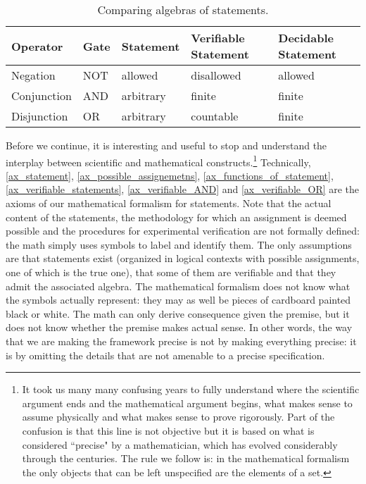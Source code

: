 \documentclass[11pt,letterpaper,fleqn]{memoir} %
\begin{document}
\begin{table}[h]
	\centering
\begin{tabular}{p{} p{} p{} p{} p{}}
	Operator & Gate & Statement & Verifiable Statement & Decidable Statement  \\ 
	\hline 
	Negation & NOT & allowed & disallowed & allowed \\ 
	Conjunction & AND & arbitrary  & finite & finite \\ 
	Disjunction & OR & arbitrary  & countable & finite \\ 
\end{tabular}
	\caption{Comparing algebras of statements.}
\end{table}

Before we continue, it is interesting and useful to stop and understand the interplay between scientific and mathematical constructs.\footnote{It took us many many confusing years to fully understand where the scientific argument ends and the mathematical argument begins, what makes sense to assume physically and what makes sense to prove rigorously. Part of the confusion is that this line is not objective but it is based on what is considered ``precise" by a mathematician, which has evolved considerably through the centuries. The rule we follow is: in the mathematical formalism the only objects that can be left unspecified are the elements of a set.} Technically, \ref{ax_statement}, \ref{ax_possible_assignemetns}, \ref{ax_functions_of_statement}, \ref{ax_verifiable_statements}, \ref{ax_verifiable_AND} and \ref{ax_verifiable_OR} are the axioms of our mathematical formalism for statements. Note that the actual content of the statements, the methodology for which an assignment is deemed possible and the procedures for experimental verification are not formally defined: the math simply uses symbols to label and identify them. The only assumptions are that statements exist (organized in logical contexts with possible assignments, one of which is the true one), that some of them are verifiable and that they admit the associated algebra. The mathematical formalism does not know what the symbols actually represent: they may as well be pieces of cardboard painted black or white. The math can only derive consequence given the premise, but it does not know whether the premise makes actual sense. In other words, the way that we are making the framework precise is not by making everything precise: it is by omitting the details that are not amenable to a precise specification.
\end{document}
